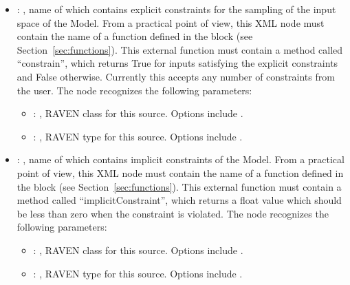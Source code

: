 \begin{itemize}
    \item {}: ,
      name of  which contains explicit constraints for the sampling of
      the input space of the Model. From a practical point of view, this XML node must contain
      the name of a function defined in the  block (see
      Section~\ref{sec:functions}).               This external function must contain a method
      called ``constrain'', which returns True for               inputs satisfying the explicit
      constraints and False otherwise. \nb Currently this accepts any number of constraints from the
      user.
      The  node recognizes the following parameters:
        \begin{itemize}
          \item {}: ,
            RAVEN class for this source. Options include .
          \item {}: ,
            RAVEN type for this source. Options include .
      \end{itemize}

    \item {}: ,
      name of  which contains implicit constraints of the Model. From a practical
      point of view, this XML node must contain the name of a function defined in the
                     block (see Section~\ref{sec:functions}). This external
      function must contain a method called               ``implicitConstraint'', which returns a
      float value which should         be less than zero when the constraint is violated.
      The  node recognizes the following parameters:
        \begin{itemize}
          \item {}: ,
            RAVEN class for this source. Options include .
          \item {}: ,
            RAVEN type for this source. Options include .
      \end{itemize}


\end{itemize}
